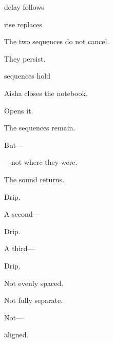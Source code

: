  delay follows

 rise replaces

\medskip

The two sequences do not cancel.

\medskip

They persist.

\medskip

\begin{center}
 sequences hold
\end{center}

\medskip

Aisha closes the notebook.

\medskip

Opens it.

\medskip

The sequences remain.

\medskip

But---

\medskip

---not where they were.

\medskip

The sound returns.

\medskip

Drip.

\medskip

A second---

\medskip

Drip.

\medskip

A third---

\medskip

Drip.

\medskip

Not evenly spaced.

\medskip

Not fully separate.

\medskip

Not---

\medskip

aligned.
